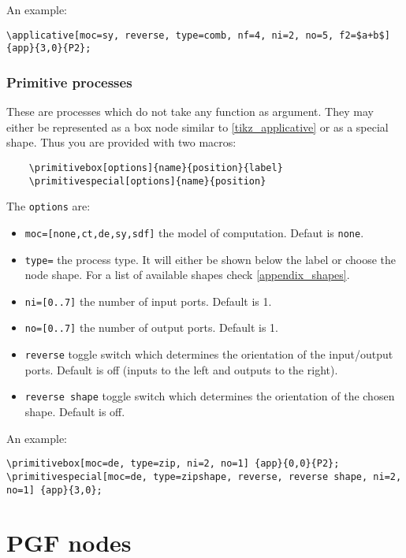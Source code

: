 \documentclass[10pt]{article}
\begin{document}
An example:
\begin{verbatim}
\applicative[moc=sy, reverse, type=comb, nf=4, ni=2, no=5, f2=$a+b$] {app}{3,0}{P2};
\end{verbatim}
\begin{figure}[htb!]\centering
{}
\end{figure}

\subsubsection{Primitive processes}

These are processes which do not take any function as argument. They may either be represented as a box node similar to \autoref{tikz_applicative} or as a special shape. Thus you are provided with two macros:

\begin{verbatim}
	\primitivebox[options]{name}{position}{label}
	\primitivespecial[options]{name}{position}
\end{verbatim}

The \texttt{options} are:
\begin{itemize}
\item \texttt{moc=[none,ct,de,sy,sdf]} the model of computation. Defaut is \texttt{none}.
\item \texttt{type=} the process type. It will either be shown below the label or choose the node shape. For a list of available shapes check \autoref{appendix_shapes}.
\item \texttt{ni=[0..7]} the number of input ports. Default is 1.
\item \texttt{no=[0..7]} the number of output ports. Default is 1.
\item\texttt{reverse} toggle switch which determines the orientation of the input/output ports. Default is off (inputs to the left and outputs to the right).
\item\texttt{reverse shape} toggle switch which determines the orientation of the chosen shape. Default is off.
\end{itemize}

An example:
\begin{verbatim}
\primitivebox[moc=de, type=zip, ni=2, no=1] {app}{0,0}{P2};
\primitivespecial[moc=de, type=zipshape, reverse, reverse shape, ni=2, no=1] {app}{3,0};
\end{verbatim}
\begin{figure}[htb!]\centering
{}
\end{figure}

\newpage
\appendix
\section{PGF nodes} \label{appendix_shapes}
\end{document}
